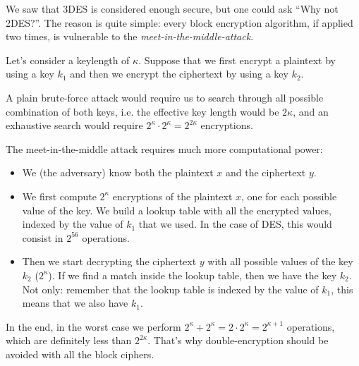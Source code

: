 \documentclass{article}
\begin{document}
  We saw that 3DES is considered enough secure, but one could ask “Why
  not 2DES?”.
  The reason is quite simple: every block encryption algorithm, if
  applied two times, is vulnerable to the
  \emph{meet-in-the-middle-attack}.

  Let's consider a keylength of $\kappa$. Suppose that we first
  encrypt a plaintext by using a key $k_{1}$ and then we encrypt the
  ciphertext by using a key $k_{2}$.

  \begin{center}
  \end{center}

  A plain brute-force attack would require us to search through all
  possible combination of both keys, i.e. the effective key length
  would be $2\kappa$, and an exhaustive search would require
  $2^{\kappa} \cdot 2^{\kappa} = 2^{2\kappa}$ encryptions. 

  The meet-in-the-middle attack requires much more computational
  power:
  \begin{itemize}
	\item We (the adversary) know both the plaintext $x$ and the
	  ciphertext $y$.
	\item We first compute $2^{\kappa}$ encryptions of the
	  plaintext $x$, one  for each possible value of the key. 
	  We build a lookup table with all the encrypted values, indexed
	  by the value of $k_{1}$ that we used. 
	  In the case of DES, this would consist in $2^{56}$ operations.
	\item Then we start decrypting the ciphertext $y$ with all possible
	  values of the key $k_{2}$ ($2^{\kappa}$). 
	  If we find a match inside the lookup
	  table, then we have the key $k_{2}$. Not only: remember that the
	  lookup table is indexed by the value of $k_{1}$, this means that
	  we also have $k_{1}$. 
  \end{itemize}

  In the end, in the worst case we perform $2^{\kappa} + 2^{\kappa} =
  2\cdot 2^{\kappa} = 2^{\kappa + 1}$ operations, which are definitely
  less than $2^{2 \kappa}$.
  That's why double-encryption should be avoided with all the block
  ciphers.
\end{document}
